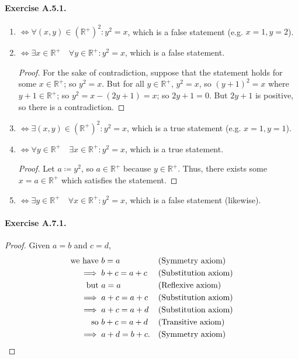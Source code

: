 \paragraph{Exercise A.5.1.}
\begin{enumerate}
    \item $\iff \forall (x,y) \in (\mathbb{R}^+)^2  : y^2=x$, which is a false statement (e.g. $x=1,y=2$). 
    \item $\iff \exists x \in \mathbb{R}^+ \quad \forall y \in \mathbb{R}^+ : y^2=x$, which is a false statement. \begin{proof}
        For the sake of contradiction, suppose that the statement holds for some $x \in \mathbb{R}^+$; so $y^2=x$. But for all $y \in \mathbb{R}^+$, $y^2=x$, so $(y+1)^2=x$ where $y+1 \in \mathbb{R}^+$; so $y^2=x-(2y+1)=x$; so $2y+1=0$. But $2y+1$ is positive, so there is a contradiction.
    \end{proof}
    \item $\iff \exists (x,y) \in (\mathbb{R}^+)^2  : y^2=x$, which is a true statement (e.g. $x=1,y=1$). 
    \item $\iff \forall y \in \mathbb{R}^+ \quad \exists x \in \mathbb{R}^+ : y^2=x$, which is a true statement. \begin{proof}
        Let $a \coloneq {y}^2$, so $a\in \mathbb{R}^+$ because $y \in \mathbb{R}^+$. Thus, there exists some $x=a\in \mathbb{R}^+$ which satisfies the statement.
    \end{proof}
    \item $\iff \exists y \in \mathbb{R}^+ \quad \forall x \in \mathbb{R}^+ : y^2=x$, which is a false statement (likewise).
\end{enumerate}

\paragraph{Exercise A.7.1.}
\begin{proof}
    Given $a=b$ and $c = d$,
    \begin{align*}
        \text{we have } {} &b=a && \text{(Symmetry axiom)}\\
        \implies {} &b+c=a+c && \text{(Substitution axiom)}\\
        \text{but } {} &a=a && \text{(Reflexive axiom)}\\
        \implies {} &a+c=a+c && \text{(Substitution axiom)}\\
        \implies {} &a+c=a+d && \text{(Substitution axiom)}\\
        \text{so } {} &b+c=a+d && \text{(Transitive axiom)}\\
        \implies {} &a+d=b+c. && \text{(Symmetry axiom)} \qedhere
    \end{align*}
\end{proof}
